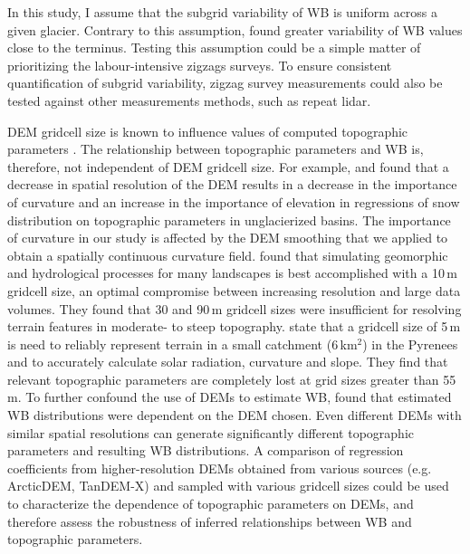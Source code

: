 \documentclass{sfuthesis}
\begin{document}
In this study, I assume that the subgrid variability of WB is uniform across a given glacier. Contrary to this assumption, \cite{McGrath2015} found greater variability of WB values close to the terminus. Testing this assumption could be a simple matter of prioritizing the labour-intensive zigzags surveys. To ensure consistent quantification of subgrid variability, zigzag survey measurements could also be tested against other measurements methods, such as repeat lidar. 

DEM gridcell size is known to influence values of computed topographic parameters \citep{Zhang1994, Garbrecht1994, Guo-an2001, Lopez2010}. The relationship between topographic parameters and WB is, therefore, not independent of DEM gridcell size. For example, \cite{Kienzle2004} and \cite{Lopez2010} found that a decrease in spatial resolution of the DEM results in a decrease in the importance of curvature and an increase in the importance of elevation in regressions of snow distribution on topographic parameters in unglacierized basins. The importance of curvature in our study is affected by the DEM smoothing that we applied to obtain a spatially continuous curvature field. \cite{Zhang1994} found that simulating geomorphic and hydrological processes for many landscapes is best accomplished with a 10\,m gridcell size, an optimal compromise between increasing resolution and large data volumes. They found that 30 and 90\,m gridcell sizes were insufficient for resolving terrain features in moderate- to steep topography. \cite{Lopez2010} state that a gridcell size of 5\,m is need to reliably represent terrain in a small catchment (6\,km$^2$) in the Pyrenees and to accurately calculate solar radiation, curvature and slope. They find that relevant topographic parameters are completely lost at grid sizes greater than 55\,m. To further confound the use of DEMs to estimate WB, \cite{Molotch2005} found that estimated WB distributions were dependent on the DEM chosen. Even different DEMs with similar spatial resolutions can generate significantly different topographic parameters and resulting WB distributions. A comparison of regression coefficients from higher-resolution DEMs obtained from various sources (e.g. ArcticDEM, TanDEM-X) and sampled with various gridcell sizes could be used to characterize the dependence of topographic parameters on DEMs, and therefore assess the robustness of inferred relationships between WB and topographic parameters. 
\end{document}
